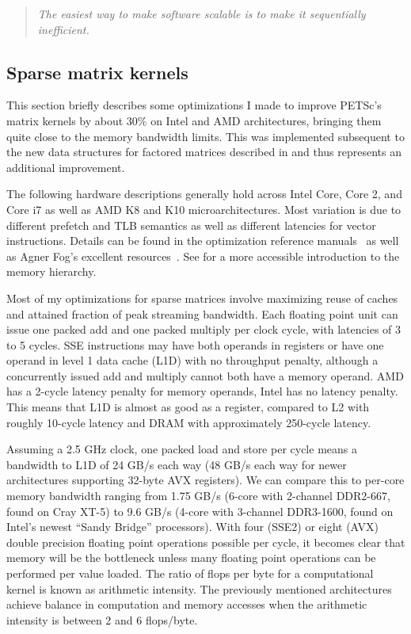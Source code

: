 \begin{quote}
  \emph{The easiest way to make software scalable is to make it sequentially inefficient.}~\citep{gropp1999exploiting}
\end{quote}

\subsection{Sparse matrix kernels}\label{ssec:sparsekernels}

This section briefly describes some optimizations I made to improve PETSc's matrix kernels by about 30\% on Intel and AMD architectures, bringing them quite close to the memory bandwidth limits.
This was implemented subsequent to the new data structures for factored matrices described in \citet{smith2010sparse} and thus represents an additional improvement.

The following hardware descriptions generally hold across Intel Core, Core 2, and Core i7 as well as AMD K8 and K10 microarchitectures.
Most variation is due to different prefetch and TLB semantics as well as different latencies for vector instructions.
Details can be found in the optimization reference manuals~\citep{intel2011optimization,amd2009optimization} as well as Agner Fog's excellent resources~\citet{fog2011michoarchitecture,fog2011instruction}.
See \citet{drepper2007memory} for a more accessible introduction to the memory hierarchy.

Most of my optimizations for sparse matrices involve maximizing reuse of caches and attained fraction of peak streaming bandwidth.
Each floating point unit can issue one packed add and one packed multiply per clock cycle, with latencies of 3 to 5 cycles.
SSE instructions may have both operands in registers or have one operand in level 1 data cache (L1D) with no throughput penalty, although a concurrently issued add and multiply cannot both have a memory operand.
AMD has a 2-cycle latency penalty for memory operands, Intel has no latency penalty.
This means that L1D is almost as good as a register, compared to L2 with roughly 10-cycle latency and DRAM with approximately 250-cycle latency.

Assuming a 2.5 GHz clock, one packed load and store per cycle means a bandwidth to L1D of 24 GB/s each way (48 GB/s each way for newer architectures supporting 32-byte AVX registers).
We can compare this to per-core memory bandwidth ranging from 1.75 GB/s (6-core with 2-channel DDR2-667, found on Cray XT-5) to 9.6 GB/s (4-core with 3-channel DDR3-1600, found on Intel's newest ``Sandy Bridge'' processors).
With four (SSE2) or eight (AVX) double precision floating point operations possible per cycle, it becomes clear that memory will be the bottleneck unless many floating point operations can be performed per value loaded.
The ratio of flops per byte for a computational kernel is known as arithmetic intensity.
The previously mentioned architectures achieve balance in computation and memory accesses when the arithmetic intensity is between 2 and 6 flops/byte.

